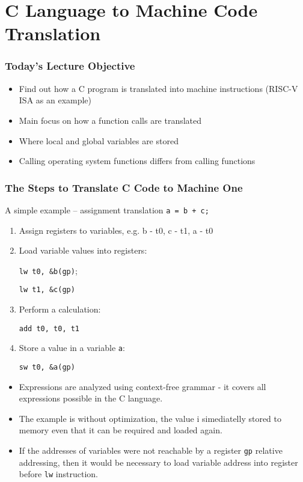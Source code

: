 \documentclass{beamer}
\subtitle{Lecture 10. Function Calls and C Language}
\author{Pavel Píša \phantom{xxxxxxxxx} Petr Štěpán \\ \small\texttt{pisa@fel.cvut.cz}\phantom{xxxx}\small\texttt{stepan@fel.cvut.cz}}
\begin{document}
\maketitle

\section{C Language to Machine Code Translation}

\begin{frame}
\frametitle{Today's Lecture Objective}

\begin{itemize}
 \item Find out how a C program is translated into machine instructions (RISC-V ISA as an example)
 \item Main focus on how a function calls are translated
 \item Where local and global variables are stored
 \item Calling operating system functions differs from calling functions
\end{itemize}
\end{frame}


\begin{frame}
\frametitle{The Steps to Translate C Code to Machine One}

A simple example -- assignment translation \texttt{a = b + c;}
\begin{enumerate}
 \item Assign registers to variables, e.g. b - t0, c - t1, a - t0
 \item Load variable values ​​into registers:
 
 \texttt{lw t0, \&b(gp)}; 
 
 \texttt{lw t1, \&c(gp)}
 \item Perform a calculation:
 
 \texttt{add t0, t0, t1}
 \item Store a value in a variable \texttt{a}: 
 
 \texttt{sw t0, \&a(gp)} 
\end{enumerate}

\medskip

\begin{itemize}
 \item Expressions are analyzed using context-free grammar - it covers all expressions possible in the C language.
 \item The example is without optimization, the value i simediatelly stored to memory even that it can be required and loaded again.
 \item If the addresses of variables were not reachable by a register \texttt{gp} relative addressing, then it would be necessary to load variable address into register before \texttt{lw} instruction.
\end{itemize}

\end{frame}
\end{document}
